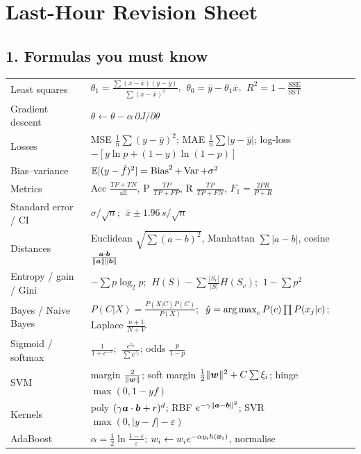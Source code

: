 \chapter*{Last-Hour Revision Sheet}

\section*{1. Formulas you must know}
\begin{center}
\small
\renewcommand{\arraystretch}{1.45}
\begin{tabular}{@{}p{4.0cm}p{12.6cm}@{}}
\toprule
Least squares & $\theta_1=\frac{\sum(x-\bar x)(y-\bar y)}{\sum(x-\bar x)^2}$, $\ \theta_0=\bar y-\theta_1\bar x$, $\ R^2=1-\frac{\mathrm{SSE}}{\mathrm{SST}}$\\
Gradient descent & $\theta\leftarrow\theta-\alpha\,\partial J/\partial\theta$\\
Losses & MSE $\frac1n\sum(y-\hat y)^2$; MAE $\frac1n\sum|y-\hat y|$; log-loss $-[y\ln p+(1-y)\ln(1-p)]$\\
Bias--variance & $\mathbb{E}[(y-\hat f)^2]=\operatorname{Bias}^2+\operatorname{Var}+\sigma^2$\\
Metrics & Acc $\frac{TP+TN}{\text{all}}$, P $\frac{TP}{TP+FP}$, R $\frac{TP}{TP+FN}$, $F_1=\frac{2PR}{P+R}$\\
Standard error / CI & $\sigma/\sqrt n$; $\ \bar x\pm1.96\,s/\sqrt n$\\
Distances & Euclidean $\sqrt{\sum(a-b)^2}$, Manhattan $\sum|a-b|$, cosine $\frac{\boldsymbol{a}\cdot\boldsymbol{b}}{\|\boldsymbol{a}\|\|\boldsymbol{b}\|}$\\
Entropy / gain / Gini & $-\sum p\log_2p$; $\ H(S)-\sum\frac{|S_v|}{|S|}H(S_v)$; $\ 1-\sum p^2$\\
Bayes / Naive Bayes & $P(C|X)=\frac{P(X|C)P(C)}{P(X)}$; $\ \hat y=\operatorname*{arg\,max}_cP(c)\prod P(x_j|c)$; Laplace $\frac{n+1}{N+V}$\\
Sigmoid / softmax & $\frac1{1+e^{-z}}$; $\ \frac{e^{z_k}}{\sum e^{z_j}}$; odds $\frac p{1-p}$\\
SVM & margin $\frac2{\|\boldsymbol{w}\|}$; soft margin $\frac12\|\boldsymbol{w}\|^2+C\sum\xi_i$; hinge $\max(0,1-yf)$\\
Kernels & poly $(\gamma\boldsymbol{a}\cdot\boldsymbol{b}+r)^d$; RBF $e^{-\gamma\|\boldsymbol{a}-\boldsymbol{b}\|^2}$; SVR $\max(0,|y-f|-\varepsilon)$\\
AdaBoost & $\alpha=\frac12\ln\frac{1-\varepsilon}{\varepsilon}$; $w_i\leftarrow w_ie^{-\alpha y_ih(\boldsymbol{x}_i)}$, normalise\\

\end{tabular}
\end{center}
